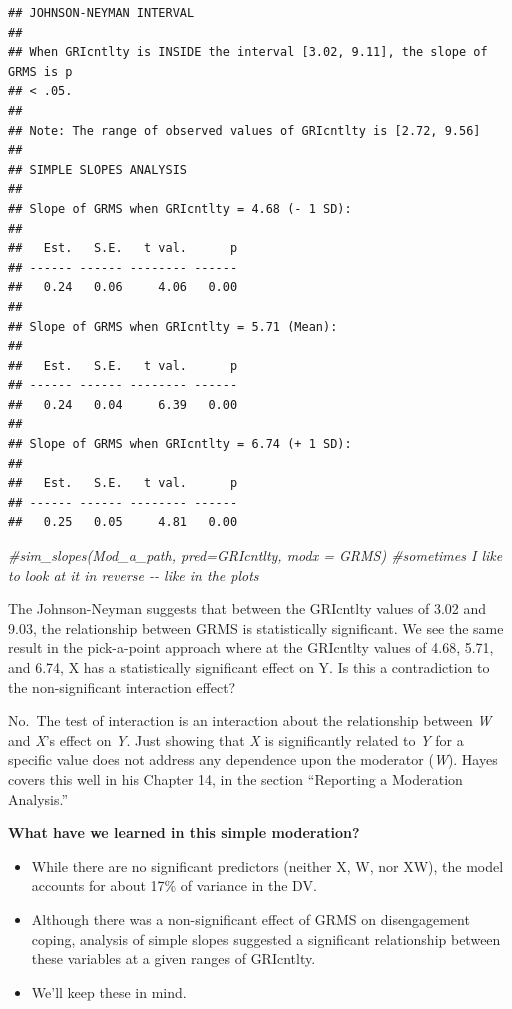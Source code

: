 \documentclass[
  english,
]{book}
\newenvironment{Shaded}{\begin{snugshade}}{\end{snugshade}}
\newcommand{\CommentTok}[1]{\textcolor[rgb]{0.56,0.35,0.01}{\textit{#1}}}
\providecommand{\tightlist}{%
  \setlength{\itemsep}{0pt}\setlength{\parskip}{0pt}}
\begin{document}
\begin{verbatim}
## JOHNSON-NEYMAN INTERVAL 
## 
## When GRIcntlty is INSIDE the interval [3.02, 9.11], the slope of GRMS is p
## < .05.
## 
## Note: The range of observed values of GRIcntlty is [2.72, 9.56]
## 
## SIMPLE SLOPES ANALYSIS 
## 
## Slope of GRMS when GRIcntlty = 4.68 (- 1 SD): 
## 
##   Est.   S.E.   t val.      p
## ------ ------ -------- ------
##   0.24   0.06     4.06   0.00
## 
## Slope of GRMS when GRIcntlty = 5.71 (Mean): 
## 
##   Est.   S.E.   t val.      p
## ------ ------ -------- ------
##   0.24   0.04     6.39   0.00
## 
## Slope of GRMS when GRIcntlty = 6.74 (+ 1 SD): 
## 
##   Est.   S.E.   t val.      p
## ------ ------ -------- ------
##   0.25   0.05     4.81   0.00
\end{verbatim}

\begin{Shaded}
\begin{Highlighting}[]
\CommentTok{\#sim\_slopes(Mod\_a\_path, pred=GRIcntlty, modx = GRMS) \#sometimes I like to look at it in reverse {-}{-} like in the plots}
\end{Highlighting}
\end{Shaded}

The Johnson-Neyman suggests that between the GRIcntlty values of 3.02 and 9.03, the relationship between GRMS is statistically significant. We see the same result in the pick-a-point approach where at the GRIcntlty values of 4.68, 5.71, and 6.74, X has a statistically significant effect on Y. Is this a contradiction to the non-significant interaction effect?

No.~The test of interaction is an interaction about the relationship between \emph{W} and \emph{X}'s effect on \emph{Y}. Just showing that \emph{X} is significantly related to \emph{Y} for a specific value does not address any dependence upon the moderator (\emph{W}). Hayes \citeyearpar{hayes_introduction_2018} covers this well in his Chapter 14, in the section ``Reporting a Moderation Analysis.''

\textbf{What have we learned in this simple moderation?}

\begin{itemize}
\tightlist
\item
  While there are no significant predictors (neither X, W, nor XW), the model accounts for about 17\% of variance in the DV.
\item
  Although there was a non-significant effect of GRMS on disengagement coping, analysis of simple slopes suggested a significant relationship between these variables at a given ranges of GRIcntlty.
\item
  We'll keep these in mind.
\end{itemize}
\end{document}
